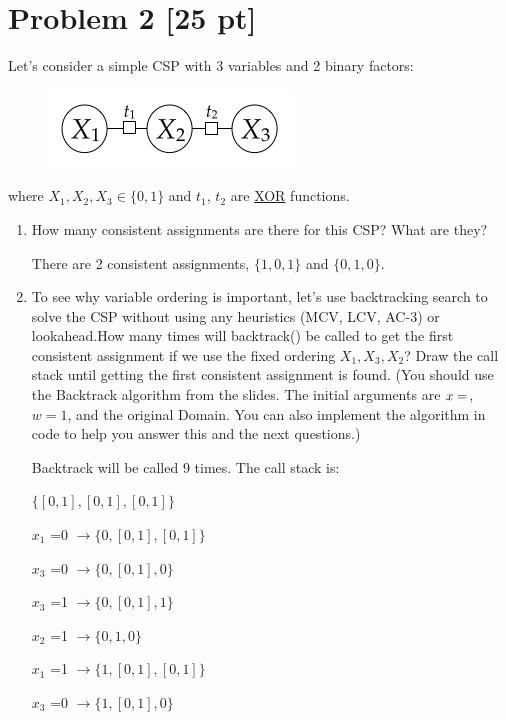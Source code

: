 \documentclass[12pt]{article}
\theoremstyle{case}
\begin{document}
\newpage
\section*{Problem 2 [25 pt]}
Let's consider a simple CSP with 3 variables and 2 binary factors:
\begin{figure}[h]
\includegraphics[width=.3\textwidth]{assignment4_2.png}
\centering
\end{figure}

where $X_1, X_2, X_3 \in \{0,1\}$ and $t_1$, $t_2$ are \href{https://en.wikipedia.org/wiki/Exclusive_or}{XOR} functions.

\begin{enumerate} [label=(\alph*)]
    \item
    How many consistent assignments are there for this CSP? What are they?

There are 2 consistent assignments, $\{1, 0, 1\}$ and $\{0, 1, 0\}$.
    
    \item
    To see why variable ordering is important, let's use backtracking search to solve the CSP without using any heuristics (MCV, LCV, AC-3) or lookahead.How many times will backtrack() be called to get the first consistent assignment if we use the fixed ordering $X_1, X_3, X_2$? Draw the call stack until getting the first consistent assignment is found. (You should use the Backtrack algorithm from the slides. The initial arguments are $x=\empty$, $w=1$, and the original Domain. You can also implement the algorithm in code to help you answer this and the next questions.)
    
Backtrack will be called 9 times. The call stack is:

$\{[0,1],[0,1],[0,1]\}$


                           $x_{1}$ =0 $\rightarrow \{0, [0,1],[0,1]\}$

                           $x_{3}$ =0 $\rightarrow \{0, [0,1], 0\}$

                           $x_{3}$ =1 $\rightarrow \{0, [0,1], 1\}$

                           $x_{2}$ =1 $\rightarrow \{0, 1, 0\}$

                           $x_{1}$ =1 $\rightarrow \{1, [0,1],[0,1]\}$

                           $x_{3}$ =0 $\rightarrow \{1, [0,1], 0\}$


\end{enumerate}
\end{document}

